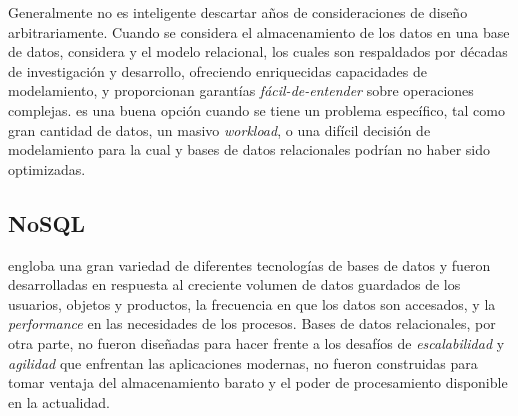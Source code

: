 Generalmente no es inteligente descartar años de consideraciones de diseño arbitrariamente. Cuando se considera el almacenamiento de los datos en una base de datos, considera  y el modelo relacional, los cuales son respaldados por décadas  de investigación y desarrollo, ofreciendo enriquecidas capacidades de modelamiento, y proporcionan garantías \textit{fácil-de-entender} sobre operaciones complejas.  es una buena opción cuando se tiene un problema específico, tal como gran cantidad de datos, un masivo \textit{workload}, o una difícil decisión de modelamiento para la cual  y bases de datos relacionales podrían no haber sido optimizadas.

\subsection{NoSQL}

 engloba una gran variedad de diferentes tecnologías de bases de datos y fueron desarrolladas en respuesta al creciente volumen de datos guardados de los usuarios, objetos y productos, la frecuencia en que los datos son accesados, y la \textit{performance} en las necesidades de los procesos. Bases de datos relacionales, por otra parte, no fueron diseñadas para hacer frente a los desafíos de \textit{escalabilidad} y \textit{agilidad} que enfrentan las aplicaciones modernas, no fueron construidas para tomar ventaja del almacenamiento barato y el poder de procesamiento disponible en la actualidad.

